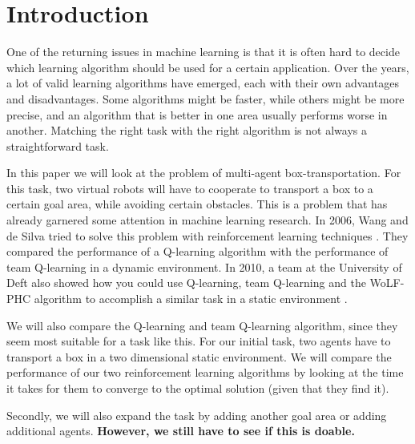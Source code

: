 \section{Introduction}
One of the returning issues in machine learning is that it is often hard to decide which learning algorithm should be used for a certain application. Over the years, a lot of valid learning algorithms have emerged, each with their own advantages and disadvantages. Some algorithms might be faster, while others might be more precise, and an algorithm that is better in one area usually performs worse in another. Matching the right task with the right algorithm is not always a straightforward task.

In this paper we will look at the problem of multi-agent box-transportation.  For this task, two virtual robots will have to cooperate to transport a box to a certain goal area, while avoiding certain obstacles. This is a problem that has already garnered some attention in machine learning research. In 2006, Wang and de Silva tried to solve this problem with reinforcement learning techniques \cite{wang2006}. They compared the performance of a Q-learning algorithm with the performance of team Q-learning in a dynamic environment. In 2010, a team at the University of Deft also showed how you could use Q-learning, team Q-learning and the WoLF-PHC algorithm to accomplish a similar task in a static environment \cite{busoniu2010}.

We will also compare the Q-learning and team Q-learning algorithm, since they seem most suitable for a task like this. For our initial task, two agents have to transport a box in a two dimensional static environment. We will compare the performance of our two reinforcement learning algorithms by looking at the time it takes for them to converge to the optimal solution (given that they find it).

Secondly, we will also expand the task by adding another goal area or adding additional agents. \textbf{However, we still have to see if this is doable.}
 
